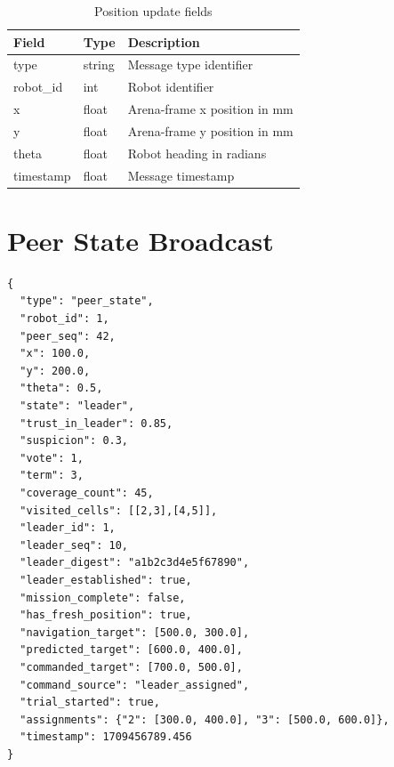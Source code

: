 \documentclass[a4paper,oneside,titlepage,11pt]{report}
\begin{document}
\begin{table}[H]
\centering
\caption{Position update fields}
\begin{tabular}{lll}
\toprule
\textbf{Field} & \textbf{Type} & \textbf{Description} \\
\midrule
type & string & Message type identifier \\
robot\_id & int & Robot identifier \\
x & float & Arena-frame x position in mm \\
y & float & Arena-frame y position in mm \\
theta & float & Robot heading in radians \\
timestamp & float & Message timestamp \\
\bottomrule
\end{tabular}
\end{table}

\section{Peer State Broadcast}
\begin{verbatim}
{
  "type": "peer_state",
  "robot_id": 1,
  "peer_seq": 42,
  "x": 100.0,
  "y": 200.0,
  "theta": 0.5,
  "state": "leader",
  "trust_in_leader": 0.85,
  "suspicion": 0.3,
  "vote": 1,
  "term": 3,
  "coverage_count": 45,
  "visited_cells": [[2,3],[4,5]],
  "leader_id": 1,
  "leader_seq": 10,
  "leader_digest": "a1b2c3d4e5f67890",
  "leader_established": true,
  "mission_complete": false,
  "has_fresh_position": true,
  "navigation_target": [500.0, 300.0],
  "predicted_target": [600.0, 400.0],
  "commanded_target": [700.0, 500.0],
  "command_source": "leader_assigned",
  "trial_started": true,
  "assignments": {"2": [300.0, 400.0], "3": [500.0, 600.0]},
  "timestamp": 1709456789.456
}
\end{verbatim}
\end{document}
